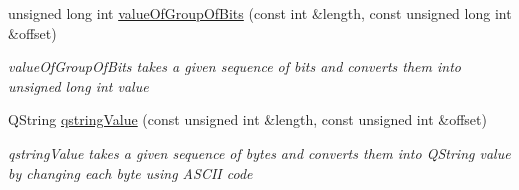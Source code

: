 \begin{DoxyCompactItemize}
unsigned long int \hyperlink{class_analyzer_aa4f23e7ef53bf9d872028a1fae5381f1}{value\-Of\-Group\-Of\-Bits} (const int \&length, const unsigned long int \&offset)
\begin{DoxyCompactList}\small\item\em value\-Of\-Group\-Of\-Bits takes a given sequence of bits and converts them into unsigned long int value \end{DoxyCompactList}\item 
Q\-String \hyperlink{class_analyzer_a02f193033c47b875cbf6eb6071556695}{qstring\-Value} (const unsigned int \&length, const unsigned int \&offset)
\begin{DoxyCompactList}\small\item\em qstring\-Value takes a given sequence of bytes and converts them into Q\-String value by changing each byte using A\-S\-C\-I\-I code \end{DoxyCompactList}\end{DoxyCompactItemize}
